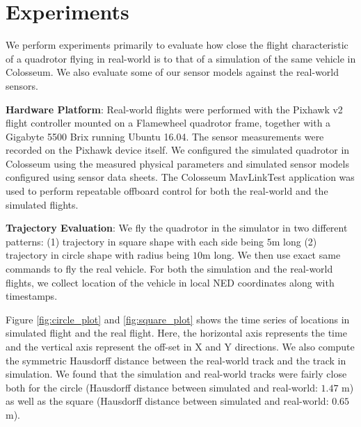 \documentclass[graybox]{svmult}
\begin{document}
	
	
	\section{Experiments}
	We perform experiments primarily to evaluate how close the flight characteristic of a quadrotor flying in real-world is to that of a simulation of the same vehicle in Colosseum. We also evaluate some of our sensor models against the real-world sensors.
	
	\vspace{0.075in}
	\noindent \textbf{Hardware Platform}: Real-world flights were performed with the Pixhawk v2 flight controller mounted on a Flamewheel quadrotor frame, together with a Gigabyte 5500 Brix running Ubuntu 16.04. The sensor measurements were recorded on the Pixhawk device itself. We configured the simulated quadrotor in Colosseum using the measured physical parameters and simulated sensor models configured using sensor data sheets. The Colosseum MavLinkTest application was used to perform repeatable offboard control for both the real-world and the simulated flights.
	
	\vspace{0.075in}
	\noindent \textbf{Trajectory Evaluation}: We fly the quadrotor in the simulator in two different patterns: (1) trajectory in square shape with each side being $5$m long (2) trajectory in circle shape with radius being $10$m long. We then use exact same commands to fly the real vehicle. For both the simulation and the real-world flights, we collect location of the vehicle in local NED coordinates along with timestamps.
	
	Figure \ref{fig:circle_plot} and \ref{fig:square_plot} shows the time series of locations in simulated flight and the real flight. Here, the horizontal axis represents the time and the vertical axis represent the off-set in X and Y directions. We also compute the symmetric Hausdorff distance between the real-world track and the track in simulation. We found that the simulation and real-world tracks were fairly close both for the circle (Hausdorff distance between simulated and real-world: $1.47$ m) as well as the square (Hausdorff distance between simulated and real-world: $0.65$ m).
	
\end{document}

